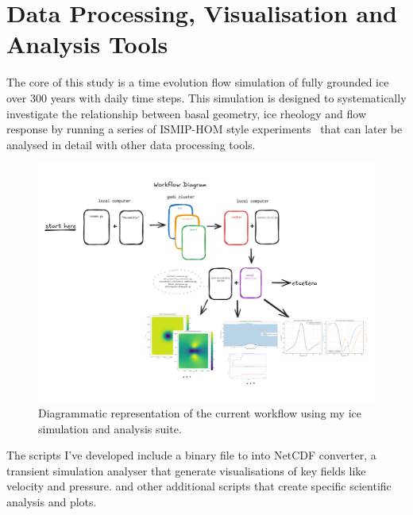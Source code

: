 \section{Data Processing, Visualisation and Analysis Tools}\label{analysis_tools}
The core of this study is a time evolution flow simulation of fully grounded ice over 300 years with daily time steps. This simulation is designed to systematically investigate the relationship between basal geometry, ice rheology and flow response by running a series of ISMIP-HOM style experiments~\cite{Pattyn_2008} that can later be analysed in detail with other data processing tools.
\begin{figure}[H]
    \includegraphics[scale=0.55]{figures/workflow_diagram.pdf}
    \caption{Diagrammatic representation of the current workflow using my ice simulation and analysis suite.}
    \label{fig:workflow}
\end{figure}
The scripts I've developed include a binary file to into NetCDF converter, a transient simulation analyser that generate visualisations of key fields like velocity and pressure. and other additional scripts that create specific scientific analysis and plots.

